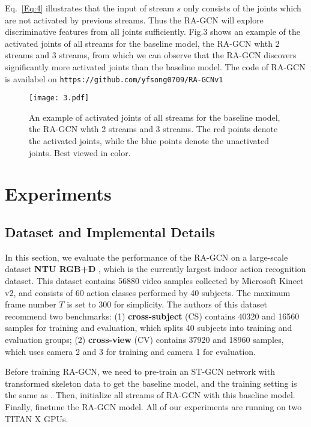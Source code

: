 \documentclass{article}
\begin{document}
Eq.~\ref{Eq:4} illustrates that the input of stream $s$ only consists of the joints which are not activated by previous streams. Thus the RA-GCN will explore discriminative features from all joints sufficiently. Fig.3 shows an example of the activated joints of all streams for the baseline model, the RA-GCN whth 2 streams and 3 streams, from which we can observe that the RA-GCN discovers significantly more activated joints than the baseline model. The code of RA-GCN is availabel on \texttt{https://github.com/yfsong0709/RA-GCNv1}

\begin{figure}[t]
\label{fig:3}
\centerline{\texttt{[image: 3.pdf]}}
\caption{An example of activated joints of all streams for the baseline model, the RA-GCN whth 2 streams and 3 streams. The {\color{red}red} points denote the activated joints, while the {\color{blue}blue} points denote the unactivated joints. Best viewed in color.}
\vspace{-0.2cm}
\end{figure}


\section{Experiments}
\label{sec:experiments}

\subsection{Dataset and Implemental Details}
\label{ssec:dataset}

In this section, we evaluate the performance of the RA-GCN on a large-scale dataset {\bf NTU RGB+D} \cite{Shahroudy2016}, which is the currently largest indoor action recognition dataset. This dataset contains 56880 video samples collected by Microsoft Kinect v2, and consists of 60 action classes performed by 40 subjects. The maximum frame number $T$ is set to 300 for simplicity. The authors of this dataset recommend two benchmarks:  (1) {\bf cross-subject} (CS) contains 40320 and 16560 samples for training and evaluation, which splits 40 subjects into training and evaluation groups; (2) {\bf cross-view} (CV) contains 37920 and 18960 samples, which uses camera 2 and 3 for training and camera 1 for evaluation.

Before training RA-GCN, we need to pre-train an ST-GCN network with transformed skeleton data to get the baseline model, and the training setting is the same as \cite{Yan2018}. Then, initialize all streams of RA-GCN with this baseline model. Finally, finetune the RA-GCN model. All of our experiments are running on two TITAN X GPUs.
\end{document}
